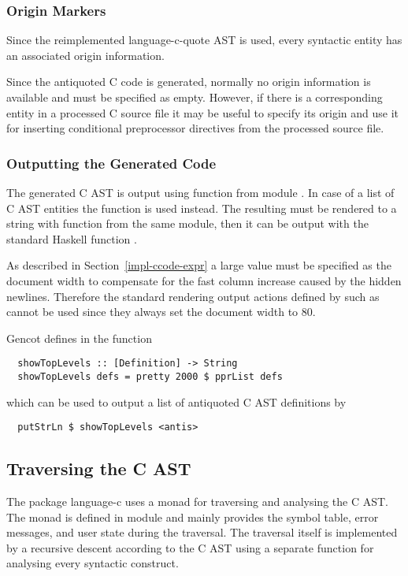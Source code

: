 \subsubsection{Origin Markers}

Since the reimplemented language-c-quote AST is used, every syntactic entity has an associated origin information.

Since the antiquoted C code is generated, normally no origin information is available and must be specified as
empty. However, if there is a corresponding entity in a processed C source file it may be useful to specify 
its origin and use it for inserting conditional preprocessor directives from the processed source file.

\subsubsection{Outputting the Generated Code}

The generated C AST is output using function  from module . In case of 
a list of C AST entities the function  is used instead. The resulting
 must be rendered to a string with function  from the same module, then it can be 
output with the standard Haskell function . 

As described in 
Section~\ref{impl-ccode-expr} a large value must be specified as the document width to compensate for the 
fast column increase caused by the hidden newlines. Therefore the standard rendering output actions defined
by  such as  cannot be used since they always set the document
width to 80.

Gencot defines in  the function
\begin{verbatim}
  showTopLevels :: [Definition] -> String
  showTopLevels defs = pretty 2000 $ pprList defs
\end{verbatim}
which can be used to output a list  of antiquoted C AST definitions by
\begin{verbatim}
  putStrLn $ showTopLevels <antis>
\end{verbatim}

\subsection{Traversing the C AST}
\label{impl-ccode-trav}

The package language-c uses a monad  for traversing and analysing the C AST. The monad is defined in module
 and mainly provides the symbol table, error messages, and user state during the traversal.
The traversal itself is implemented by a recursive descent according to the C AST using a separate function
for analysing every syntactic construct.

